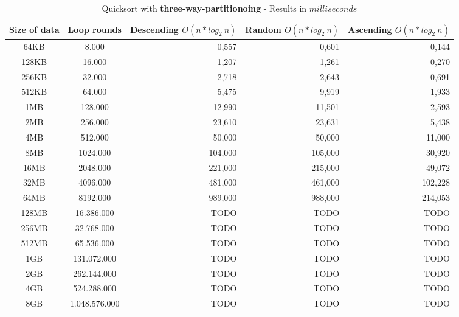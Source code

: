 \documentclass[11pt]{amsart}
\begin{document}
\begin{table}[htdp]
	\caption{Quicksort with \textbf{three-way-partitionoing} - Results in $milliseconds$}
	\begin{tabular}{|c|c|r|r|r|} \hline
		Size of data & Loop rounds & \parbox[c]{3.5cm}{Descending \\ $O(n*log_2~n)$} & \parbox[c]{3.5cm}{Random \\$O(n*log_2~n)$} & \parbox[c]{3.5cm}{Ascending \\ $O(n*log_2~n)$} \\ \hline
		64KB & 8.000 & 0,557 & 0,601 & 0,144 \\ \hline
		128KB & 16.000 & 1,207 & 1,261 & 0,270 \\ \hline
		256KB & 32.000& 2,718 & 2,643 & 0,691 \\ \hline
		512KB & 64.000 & 5,475 & 9,919 & 1,933 \\ \hline
		1MB & 128.000 & 12,990 & 11,501 & 2,593 \\ \hline
		2MB & 256.000 & 23,610 & 23,631 & 5,438 \\ \hline
		4MB & 512.000 & 50,000 & 50,000 & 11,000 \\ \hline
		8MB & 1024.000 & 104,000 & 105,000 & 30,920 \\ \hline
		16MB & 2048.000 & 221,000 & 215,000 & 49,072 \\ \hline
		32MB & 4096.000 & 481,000 & 461,000 & 102,228 \\ \hline
		64MB & 8192.000 & 989,000 & 988,000 & 214,053 \\ \hline
		128MB & 16.386.000 & TODO & TODO & TODO \\ \hline
		256MB & 32.768.000 & TODO & TODO & TODO \\ \hline
		512MB & 65.536.000 & TODO & TODO & TODO \\ \hline
		1GB & 131.072.000 & TODO & TODO & TODO \\ \hline
		2GB & 262.144.000 & TODO & TODO & TODO \\ \hline
		4GB & 524.288.000 & TODO & TODO & TODO \\ \hline
		8GB & 1.048.576.000 & TODO & TODO & TODO \\ \hline
	\end{tabular}
	\label{default}
\end{table}%
\end{document}
